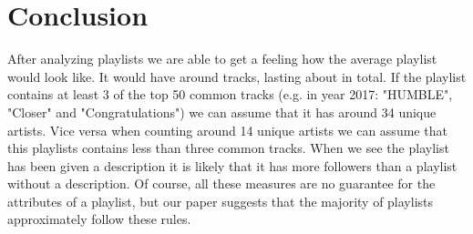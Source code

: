 \section{Conclusion}

After analyzing  playlists we are able to get a feeling how the average  playlist would look like. It would have around  tracks, lasting about  in total. If the playlist contains at least 3  of the top 50 common tracks (e.g. in year 2017: "HUMBLE", "Closer" and "Congratulations") we can assume that it has around 34 unique artists. Vice versa when counting around 14 unique artists we can assume that this playlists contains less than three common tracks. When we see the playlist has been given a description it is likely that it has more followers than a playlist without a description. Of course, all these measures are no guarantee for the attributes of a playlist, but our paper suggests that the majority of playlists approximately follow these rules.